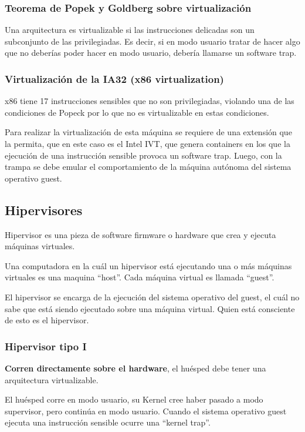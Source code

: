 \documentclass[a4paper, twoside]{article}
\begin{document}
\subsubsection{Teorema de Popek y Goldberg sobre virtualización}
Una arquitectura es virtualizable si las instrucciones delicadas son un subconjunto de las privilegiadas. Es decir, si en modo usuario tratar de hacer algo que no deberías poder hacer en modo usuario, debería llamarse un software trap.

\subsubsection{Virtualización de la IA32 (x86 virtualization)}
x86 tiene 17 instrucciones sensibles que no son privilegiadas, violando una de las condiciones de Popeck por lo que no es virtualizable en estas condiciones.

Para realizar la virtualización de esta máquina se requiere de una extensión que la permita, que en este caso es el Intel IVT, que genera containers en los que la ejecución de una instrucción sensible provoca un software trap. Luego, con la trampa se debe emular el comportamiento de la máquina autónoma del sistema operativo guest.

\subsection{Hipervisores}
Hipervisor es una pieza de software firmware o hardware que crea y ejecuta máquinas virtuales.

Una computadora en la cuál un hipervisor está ejecutando una o más máquinas virtuales es una maquina ``host''. Cada máquina virtual es llamada ``guest''.

El hipervisor se encarga de la ejecución del sistema operativo del guest, el cuál no sabe que está siendo ejecutado sobre una máquina virtual. Quien está consciente de esto es el hipervisor.

\subsubsection{Hipervisor tipo I}
\textbf{Corren directamente sobre el hardware}, el huésped debe tener una arquitectura virtualizable.

El huésped corre en modo usuario, su Kernel cree haber pasado a modo supervisor, pero continúa en modo usuario.
Cuando el sistema operativo guest ejecuta una instrucción sensible ocurre una ``kernel trap''.
\end{document}
